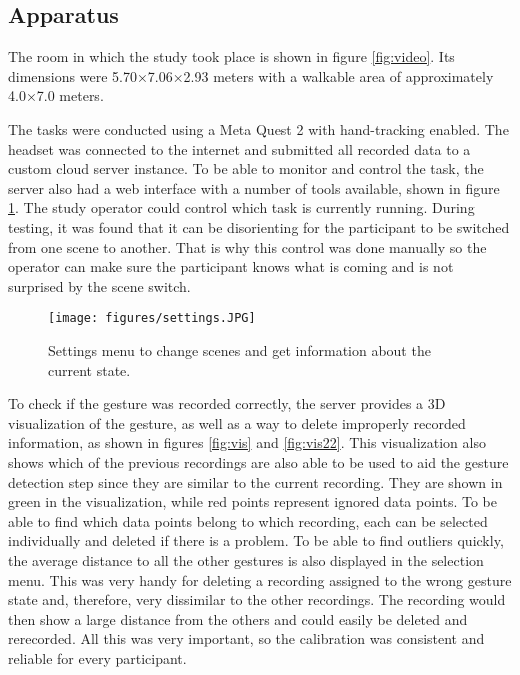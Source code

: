 \subsection{Apparatus}

The room in which the study took place is shown in figure \ref{fig:video}. Its dimensions were 5.70×7.06×2.93 meters with a walkable area of approximately 4.0×7.0 meters.

The tasks were conducted using a Meta Quest 2 with hand-tracking enabled. The headset was connected to the internet and submitted all recorded data to a custom cloud server instance. To be able to monitor and control the task, the server also had a web interface with a number of tools available, shown in figure \ref{fig:settings}. The study operator could control which task is currently running. During testing, it was found that it can be disorienting for the participant to be switched from one scene to another. That is why this control was done manually so the operator can make sure the participant knows what is coming and is not surprised by the scene switch.

\begin{figure}[!ht]
    \centering
    \texttt{[image: figures/settings.JPG]}
    \caption{Settings menu to change scenes and get information about the current state.}
    \label{fig:settings}
\end{figure}

To check if the gesture was recorded correctly, the server provides a 3D visualization of the gesture, as well as a way to delete improperly recorded information, as shown in figures \ref{fig:vis} and  \ref{fig:vis22}. This visualization also shows which of the previous recordings are also able to be used to aid the gesture detection step since they are similar to the current recording. They are shown in green in the visualization, while red points represent ignored data points. To be able to find which data points belong to which recording, each can be selected individually and deleted if there is a problem. To be able to find outliers quickly, the average distance to all the other gestures is also displayed in the selection menu. This was very handy for deleting a recording assigned to the wrong gesture state and, therefore, very dissimilar to the other recordings. The recording would then show a large distance from the others and could easily be deleted and rerecorded. All this was very important, so the calibration was consistent and reliable for every participant.

